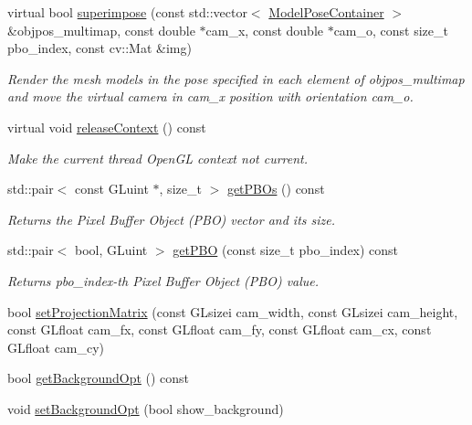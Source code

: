 \begin{DoxyCompactItemize}
virtual bool \mbox{\hyperlink{classSICAD_a264db68e6189b5907d162947267be056}{superimpose}} (const std\+::vector$<$ \mbox{\hyperlink{classSuperimpose_a178e3d4e2def6635bfcf9454dd4b5d22}{Model\+Pose\+Container}} $>$ \&objpos\+\_\+multimap, const double $\ast$cam\+\_\+x, const double $\ast$cam\+\_\+o, const size\+\_\+t pbo\+\_\+index, const cv\+::\+Mat \&img)
\begin{DoxyCompactList}\small\item\em Render the mesh models in the pose specified in each element of {\ttfamily objpos\+\_\+multimap} and move the virtual camera in {\ttfamily cam\+\_\+x} position with orientation {\ttfamily cam\+\_\+o}. \end{DoxyCompactList}\item 
virtual void \mbox{\hyperlink{classSICAD_ae626fa7f8fd4dc5fc4bdc4f5311beede}{release\+Context}} () const
\begin{DoxyCompactList}\small\item\em Make the current thread Open\+GL context not current. \end{DoxyCompactList}\item 
std\+::pair$<$ const G\+Luint $\ast$, size\+\_\+t $>$ \mbox{\hyperlink{classSICAD_a02c1c9f6c83bd9df278cdcfdaa78ccf4}{get\+P\+B\+Os}} () const
\begin{DoxyCompactList}\small\item\em Returns the Pixel Buffer Object (P\+BO) vector and its size. \end{DoxyCompactList}\item 
std\+::pair$<$ bool, G\+Luint $>$ \mbox{\hyperlink{classSICAD_adb0158ae3b9e5741df2fae4d50280809}{get\+P\+BO}} (const size\+\_\+t pbo\+\_\+index) const
\begin{DoxyCompactList}\small\item\em Returns {\ttfamily pbo\+\_\+index}-\/th Pixel Buffer Object (P\+BO) value. \end{DoxyCompactList}\item 
bool \mbox{\hyperlink{classSICAD_a39cdff6871d32429d8ba95b776e0b874}{set\+Projection\+Matrix}} (const G\+Lsizei cam\+\_\+width, const G\+Lsizei cam\+\_\+height, const G\+Lfloat cam\+\_\+fx, const G\+Lfloat cam\+\_\+fy, const G\+Lfloat cam\+\_\+cx, const G\+Lfloat cam\+\_\+cy)
\item 
bool \mbox{\hyperlink{classSICAD_a170bd325654aed9eb81062ac610608fa}{get\+Background\+Opt}} () const
\item 
void \mbox{\hyperlink{classSICAD_a07921943ad3d4016dcbe76135e799754}{set\+Background\+Opt}} (bool show\+\_\+background)

\end{DoxyCompactItemize}
